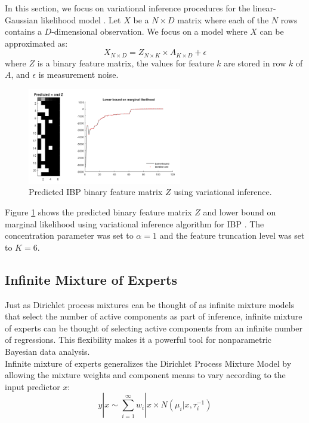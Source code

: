 In this section, we focus on variational inference procedures for the linear-Gaussian likelihood model \cite{DosMilVan2009a}. Let $X$ be a $N\times D$ matrix where each of the $N$ rows contains a $D$-dimensional observation. We focus on a model where $X$ can be approximated as:
\begin{equation}
    X_{N\times D} = Z_{N\times K} \times A_{K\times D} + \epsilon
\end{equation}
where $Z$ is a binary feature matrix, the values for feature $k$ are stored in row $k$ of $A$, and $\epsilon$ is measurement noise.
\begin{figure}[thpb]
    \centering
    \includegraphics[width=0.6\textwidth, trim={10 10 10 10}]{figures/ibp_z.png}
    \caption{Predicted IBP binary feature matrix $Z$ using variational inference.}
    \label{fig:ibp_z}
\end{figure}
Figure \ref{fig:ibp_z} shows the predicted binary feature matrix $Z$ and lower bound on marginal likelihood using variational inference algorithm for IBP \cite{DosMilVan2009a}. The concentration parameter was set to $\alpha=1$ and the feature truncation level was set to $K=6$. 


\subsection{Infinite Mixture of Experts}

Just as Dirichlet process mixtures can be thought of as infinite mixture models that select the number of active components as part of inference, infinite mixture of experts can be thought of selecting active components from an infinite number of regressions. This flexibility makes it a powerful tool for nonparametric Bayesian data analysis.\\

Infinite mixture of experts generalizes the Dirichlet Process Mixture Model by allowing the mixture weights and component means to vary according to the input predictor $x$:
\begin{equation}
    y | x \sim \sum_{i=1}^{\infty} w_i | x \times N(\mu_i|x, \tau_i^{-1})
\end{equation}

